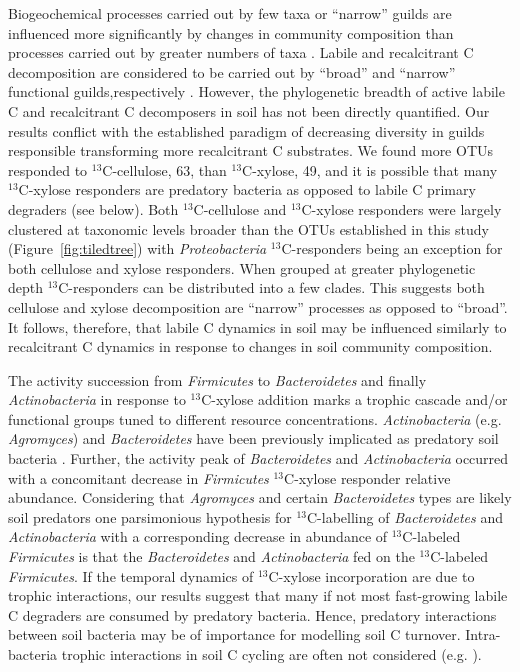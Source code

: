 Biogeochemical processes carried out by few taxa or ``narrow'' guilds are
influenced more significantly by changes in community composition than
processes carried out by greater numbers of taxa
\citep{Schimel_1995,McGuire2010}. Labile and recalcitrant C decomposition are
considered to be carried out by ``broad'' and ``narrow'' functional
guilds,respectively \citep{Schimel_1995,McGuire2010}. However, the phylogenetic
breadth of active labile C and recalcitrant C decomposers in soil has not been
directly quantified. Our results conflict with the established paradigm of
decreasing diversity in guilds responsible transforming more recalcitrant
C substrates. We found more OTUs responded to $^{13}$C-cellulose, 63, than
$^{13}$C-xylose, 49, and it is possible that many $^{13}$C-xylose responders
are predatory bacteria as opposed to labile C primary degraders (see below).
Both $^{13}$C-cellulose and $^{13}$C-xylose responders were largely clustered
at taxonomic levels broader than the OTUs established in this study
(Figure~\ref{fig:tiledtree}) with \textit{Proteobacteria} $^{13}$C-responders
being an exception for both cellulose and xylose responders. When grouped at
greater phylogenetic depth $^{13}$C-responders can be distributed into a few
clades. This suggests both cellulose and xylose decomposition are ``narrow''
processes as opposed to ``broad''. It follows, therefore, that labile C dynamics
in soil may be influenced similarly to recalcitrant C dynamics in response to
changes in soil community composition. 

The activity succession from \textit{Firmicutes} to \textit{Bacteroidetes} and
finally \textit{Actinobacteria} in response to $^{13}$C-xylose addition marks
a trophic cascade and/or functional groups tuned to different resource
concentrations. \textit{Actinobacteria} (e.g. \textit{Agromyces}) and
\textit{Bacteroidetes} have been previously implicated as predatory soil
bacteria \citep{Lueders2006}. Further, the activity peak of
\textit{Bacteroidetes} and \textit{Actinobacteria} occurred with a concomitant
decrease in \textit{Firmicutes} $^{13}$C-xylose responder relative abundance.
Considering that \textit{Agromyces} and certain \textit{Bacteroidetes} types
are likely soil predators \citep{Lueders2006,16346402} one parsimonious
hypothesis for $^{13}$C-labelling of \textit{Bacteroidetes} and
\textit{Actinobacteria} with a corresponding decrease in abundance of
$^{13}$C-labeled \textit{Firmicutes} is that the \textit{Bacteroidetes} and
\textit{Actinobacteria} fed on the $^{13}$C-labeled \textit{Firmicutes}. If the
temporal dynamics of $^{13}$C-xylose incorporation are due to trophic
interactions, our results suggest that many if not most fast-growing labile
C degraders are consumed by predatory bacteria. Hence, predatory interactions
between soil bacteria may be of importance for modelling soil C turnover.
Intra-bacteria trophic interactions in soil C cycling are often not
considered (e.g. \citealt{Moore1988}).

